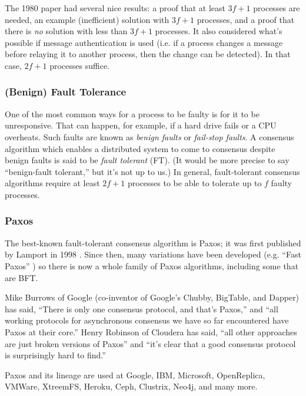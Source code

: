 The 1980 paper had several nice results:
a proof that at least $3f+1$ processes are needed,
an example (inefficient) solution with $3f+1$ processes, 
and a proof that there is \emph{no} solution with less than $3f+1$ processes.
It also considered what's possible if message authentication is used (i.e. if a process changes a message before relaying it to another process, then the change can be detected). In that case, $2f+1$ processes suffice.

\subsubsection{(Benign) Fault Tolerance}
One of the most common ways for a process to be faulty is for it to be unresponsive. That can happen, for example, if a hard drive fails or a CPU overheats. Such faults are known as \emph{benign faults} or \emph{fail-stop faults}. A consensus algorithm which enables a distributed system to come to consensus despite benign faults is said to be \emph{fault tolerant} (FT). (It would be more precise to say ``benign-fault tolerant,'' but it's not up to us.) In general, fault-tolerant consensus algorithms require at least $2f+1$ processes to be able to tolerate up to $f$ faulty processes.

\subsubsection{Paxos}
The best-known fault-tolerant consensus algorithm is Paxos; it was first published by Lamport in 1998 \cite{lamport1998part}. Since then, many variations have been developed (e.g. ``Fast Paxos'' \cite{lamport2006fast}) so there is now a whole family of Paxos algorithms, including some that are BFT. \cite{lamport2011byzantizing}

Mike Burrows of Google (co-inventor of Google’s Chubby, BigTable, and Dapper) has said, ``There is only one consensus protocol, and that’s Paxos,'' \cite{robinson2009paxos} and ``all working protocols for asynchronous consensus we have so far encountered have Paxos at their core.'' \cite{burrows2006chubby}
Henry Robinson of Cloudera has said, ``all other approaches are just broken versions of Paxos'' and ``it’s clear that a good consensus protocol is surprisingly hard to find.'' \cite{robinson2009paxos}

Paxos and its lineage are used at Google, IBM, Microsoft, OpenReplica, VMWare, XtreemFS, Heroku, Ceph, Clustrix, Neo4j, and many more. \cite{wiki_paxos}

